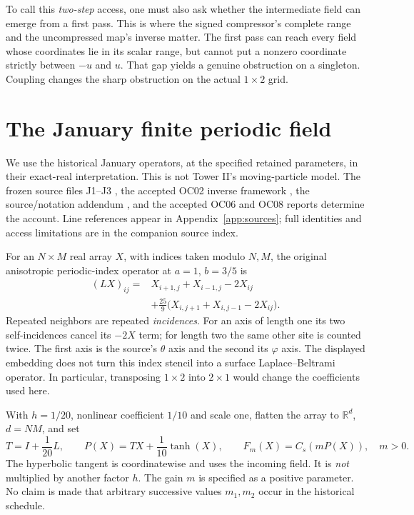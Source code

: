 \documentclass[11pt,a4paper]{article}
\theoremstyle{definition}
\theoremstyle{remark}\newtheorem{remark}[theorem]{Remark}
\newcommand{\R}{\mathbb R}
\numberwithin{equation}{section}
\begin{document}
To call this \emph{two-step} access, one must also ask whether the intermediate
field can emerge from a first pass. This is where the signed compressor's complete
range and the uncompressed map's inverse matter. The first pass can reach every
field whose coordinates lie in its scalar range, but cannot put a nonzero coordinate
strictly between $-u$ and $u$. That gap yields a genuine obstruction on a singleton.
Coupling changes the sharp obstruction on the actual $1\times2$ grid.

\section{The January finite periodic field}\label{sec:source}
We use the historical January operators, at the specified retained parameters,
in their exact-real interpretation. This is not Tower II's moving-particle model.
The frozen source files J1--J3 \cite{J1,J2,J3}, the accepted OC02 inverse framework
\cite{G}, the source/notation addendum \cite{A}, and the accepted OC06 and OC08
reports \cite{OC06,OC08} determine the account.
Line references appear in Appendix~\ref{app:sources}; full identities and access
limitations are in the companion source index.

For an $N\times M$ real array $X$, with indices taken modulo $N,M$, the original
anisotropic periodic-index operator at $a=1$, $b=3/5$ is
\begin{equation}\label{eq:L}
\begin{split}
 (LX)_{ij}={}&X_{i+1,j}+X_{i-1,j}-2X_{ij}\\
 &+\frac{25}{9}\bigl(X_{i,j+1}+X_{i,j-1}-2X_{ij}\bigr).
\end{split}
\end{equation}
Repeated neighbors are repeated \emph{incidences}. For an axis of length one its
two self-incidences cancel its $-2X$ term; for length two the same other site is
counted twice. The first axis is the source's $\theta$ axis and the second its
$\varphi$ axis. The displayed embedding does not turn this index stencil into a
surface Laplace--Beltrami operator. In particular, transposing $1\times2$ into
$2\times1$ would change the coefficients used here.

With $h=1/20$, nonlinear coefficient $1/10$ and scale one, flatten the array to
$\R^d$, $d=NM$, and set
\begin{equation}\label{eq:P}
 T=I+\frac1{20}L,\qquad
 P(X)=TX+\frac1{10}\tanh(X),\qquad F_m(X)=C_s(mP(X)),\quad m>0.
\end{equation}
The hyperbolic tangent is coordinatewise and uses the incoming field. It is
\emph{not} multiplied by another factor $h$.
The gain $m$ is specified as a positive parameter. No claim is made that arbitrary
successive values $m_1,m_2$ occur in the historical schedule.
\end{document}
